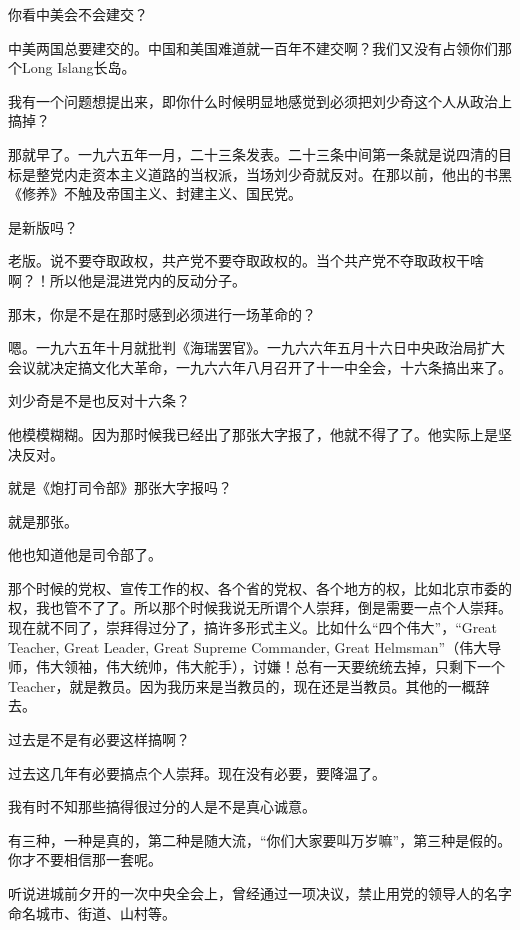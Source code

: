 你看中美会不会建交？

中美两国总要建交的。中国和美国难道就一百年不建交啊？我们又没有占领你们那个Long Islang长岛。

我有一个问题想提出来，即你什么时候明显地感觉到必须把刘少奇这个人从政治上搞掉？

那就早了。一九六五年一月，二十三条发表。二十三条中间第一条就是说四清的目标是整党内走资本主义道路的当权派，当场刘少奇就反对。在那以前，他出的书黑《修养》不触及帝国主义、封建主义、国民党。

是新版吗？

老版。说不要夺取政权，共产党不要夺取政权的。当个共产党不夺取政权干啥啊？！所以他是混进党内的反动分子。

那末，你是不是在那时感到必须进行一场革命的？

嗯。一九六五年十月就批判《海瑞罢官》。一九六六年五月十六日中央政治局扩大会议就决定搞文化大革命，一九六六年八月召开了十一中全会，十六条搞出来了。

刘少奇是不是也反对十六条？

他模模糊糊。因为那时候我已经出了那张大字报了，他就不得了了。他实际上是坚决反对。

就是《炮打司令部》那张大字报吗？

就是那张。

他也知道他是司令部了。

那个时候的党权、宣传工作的权、各个省的党权、各个地方的权，比如北京市委的权，我也管不了了。所以那个时候我说无所谓个人崇拜，倒是需要一点个人崇拜。现在就不同了，崇拜得过分了，搞许多形式主义。比如什么“四个伟大”，“Great Teacher, Great Leader, Great Supreme Commander, Great Helmsman”（伟大导师，伟大领袖，伟大统帅，伟大舵手），讨嫌！总有一天要统统去掉，只剩下一个Teacher，就是教员。因为我历来是当教员的，现在还是当教员。其他的一概辞去。

过去是不是有必要这样搞啊？

过去这几年有必要搞点个人崇拜。现在没有必要，要降温了。

我有时不知那些搞得很过分的人是不是真心诚意。

有三种，一种是真的，第二种是随大流，“你们大家要叫万岁嘛”，第三种是假的。你才不要相信那一套呢。

听说进城前夕开的一次中央全会上，曾经通过一项决议，禁止用党的领导人的名字命名城市、街道、山村等。


